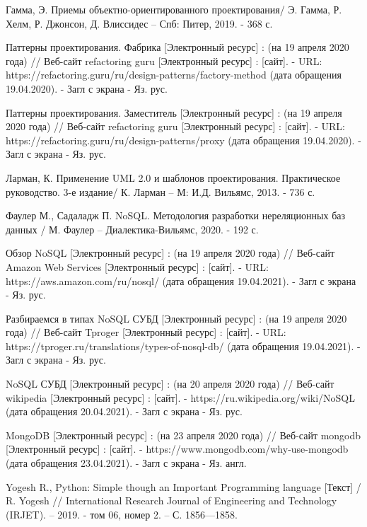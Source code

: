 \documentclass[14pt]{extreport}
\begin{document}
\begin{thebibliography}{9}
  Гамма, Э. Приемы объектно-ориентированного проектирования/ Э. Гамма, Р. Хелм, Р. Джонсон, Д. Влиссидес -- Спб: Питер, 2019. - 368 с.
  
  Паттерны проектирования. Фабрика [Электронный ресурс] : (на 19 апреля 2020 года) // Веб-сайт refactoring guru [Электронный ресурс] : [сайт]. - URL: https://refactoring.guru/ru/design-patterns/factory-method (дата обращения 19.04.2020). - Загл с экрана - Яз. рус.

Паттерны проектирования. Заместитель [Электронный ресурс] : (на 19 апреля 2020 года) // Веб-сайт refactoring guru [Электронный ресурс] : [сайт]. - URL: https://refactoring.guru/ru/design-patterns/proxy (дата обращения 19.04.2020). - Загл с экрана - Яз. рус.  

  Ларман, К. Применение UML 2.0 и шаблонов проектирования. Практическое руководство. 3-е издание/ К. Ларман -- М: И.Д. Вильямс, 2013. - 736 с.
  
     Фаулер М., Садаладж П. NoSQL. Методология разработки нереляционных баз данных / М. Фаулер -- Диалектика-Вильямс, 2020. - 192 с.
     
Обзор NoSQL [Электронный ресурс] : (на 19 апреля 2020 года) // Веб-сайт Amazon Web Services [Электронный ресурс] : [сайт]. - URL: https://aws.amazon.com/ru/nosql/ (дата обращения 19.04.2021). - Загл с экрана - Яз. рус.

Разбираемся в типах NoSQL СУБД [Электронный ресурс] : (на 19 апреля 2020 года) // Веб-сайт Tproger [Электронный ресурс] : [сайт]. - URL: https://tproger.ru/translations/types-of-nosql-db/ (дата обращения 19.04.2021). - Загл с экрана - Яз. рус.

NoSQL СУБД [Электронный ресурс] : (на 20 апреля 2020 года) // Веб-сайт wikipedia [Электронный ресурс] : [сайт]. - https://ru.wikipedia.org/wiki/NoSQL (дата обращения 20.04.2021). - Загл с экрана - Яз. рус.


MongoDB [Электронный ресурс] : (на 23 апреля 2020 года) // Веб-сайт mongodb [Электронный ресурс] : [сайт]. - https://www.mongodb.com/why-use-mongodb (дата обращения 23.04.2021). - Загл с экрана - Яз. англ.

Yogesh R., Python: Simple though an Important Programming language [Текст]  / R. Yogesh // International Research Journal of Engineering and Technology (IRJET). – 2019. - том 06, номер 2. – С. 1856—1858.


\end{thebibliography}
\end{document}
